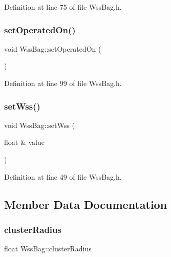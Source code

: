Definition at line 75 of file Wss\+Bag.\+h.

\mbox{\label{class_wss_bag_aa53e281e368b34888f30c2c3cef4435c}} 
\subsubsection{\texorpdfstring{set\+Operated\+On()}{setOperatedOn()}}
{\footnotesize\ttfamily void Wss\+Bag\+::set\+Operated\+On (\begin{DoxyParamCaption}{ }\end{DoxyParamCaption})\hspace{0.3cm}{\ttfamily [inline]}}



Definition at line 99 of file Wss\+Bag.\+h.

\mbox{\label{class_wss_bag_a2a36ac684d72b7e8f29b302c0805a978}} 
\subsubsection{\texorpdfstring{set\+Wss()}{setWss()}}
{\footnotesize\ttfamily void Wss\+Bag\+::set\+Wss (\begin{DoxyParamCaption}\item[{float \&}]{value }\end{DoxyParamCaption})\hspace{0.3cm}{\ttfamily [inline]}}



Definition at line 49 of file Wss\+Bag.\+h.



\subsection{Member Data Documentation}
\mbox{\label{class_wss_bag_a30ae57df2d130fd6e2ce756148d5cd51}} 
\subsubsection{\texorpdfstring{cluster\+Radius}{clusterRadius}}
{\footnotesize\ttfamily float Wss\+Bag\+::cluster\+Radius\hspace{0.3cm}{\ttfamily [protected]}}




